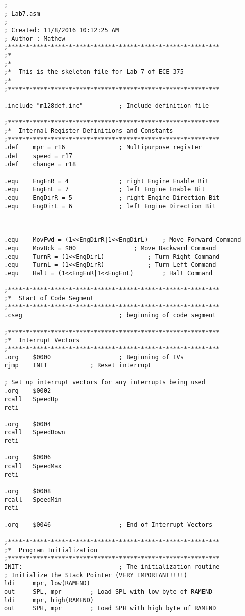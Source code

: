 \documentclass[12pt,letterpaper]{article}
\begin{document}
\begin{verbatim}
;
; Lab7.asm
;
; Created: 11/8/2016 10:12:25 AM
; Author : Mathew
;***********************************************************
;*
;*
;*	This is the skeleton file for Lab 7 of ECE 375
;*
;***********************************************************

.include "m128def.inc"			; Include definition file

;***********************************************************
;*	Internal Register Definitions and Constants
;***********************************************************
.def	mpr = r16				; Multipurpose register
.def	speed = r17
.def	change = r18

.equ	EngEnR = 4				; right Engine Enable Bit
.equ	EngEnL = 7				; left Engine Enable Bit
.equ	EngDirR = 5				; right Engine Direction Bit
.equ	EngDirL = 6				; left Engine Direction Bit



.equ	MovFwd = (1<<EngDirR|1<<EngDirL)	; Move Forward Command
.equ	MovBck = $00				; Move Backward Command
.equ	TurnR = (1<<EngDirL)			; Turn Right Command
.equ	TurnL = (1<<EngDirR)			; Turn Left Command
.equ	Halt = (1<<EngEnR|1<<EngEnL)		; Halt Command

;***********************************************************
;*	Start of Code Segment
;***********************************************************
.cseg							; beginning of code segment

;***********************************************************
;*	Interrupt Vectors
;***********************************************************
.org	$0000					; Beginning of IVs
rjmp 	INIT			; Reset interrupt

; Set up interrupt vectors for any interrupts being used
.org	$0002
rcall	SpeedUp
reti

.org	$0004
rcall	SpeedDown
reti

.org	$0006
rcall	SpeedMax
reti

.org	$0008
rcall	SpeedMin
reti

.org	$0046					; End of Interrupt Vectors

;***********************************************************
;*	Program Initialization
;***********************************************************
INIT:							; The initialization routine
; Initialize the Stack Pointer (VERY IMPORTANT!!!!)
ldi		mpr, low(RAMEND)
out		SPL, mpr		; Load SPL with low byte of RAMEND
ldi		mpr, high(RAMEND)
out		SPH, mpr		; Load SPH with high byte of RAMEND


\end{verbatim}
\end{document}
